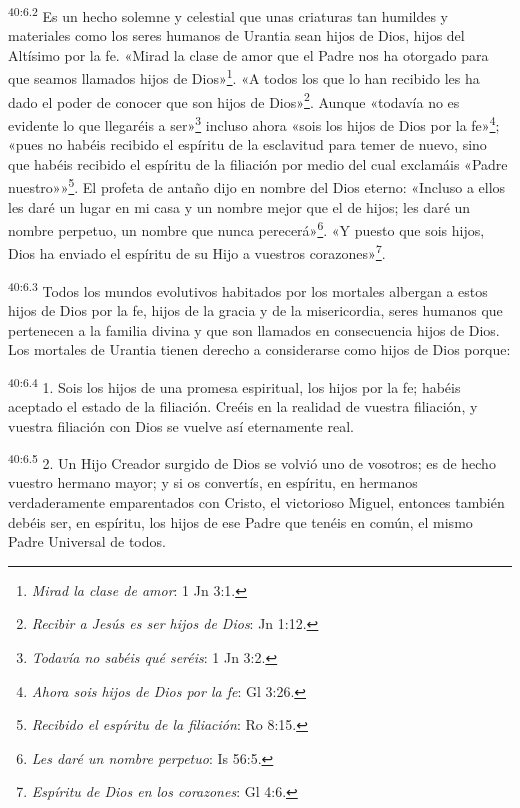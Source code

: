 \par
\textsuperscript{40:6.2} Es un hecho solemne y celestial que unas criaturas tan humildes y materiales como los seres humanos de Urantia sean hijos de Dios, hijos del Altísimo por la fe. «Mirad la clase de amor que el Padre nos ha otorgado para que seamos llamados hijos de Dios»\footnote{\textit{Mirad la clase de amor}: 1 Jn 3:1.}. «A todos los que lo han recibido les ha dado el poder de conocer que son hijos de Dios»\footnote{\textit{Recibir a Jesús es ser hijos de Dios}: Jn 1:12.}. Aunque «todavía no es evidente lo que llegaréis a ser»\footnote{\textit{Todavía no sabéis qué seréis}: 1 Jn 3:2.} incluso ahora «sois los hijos de Dios por la fe»\footnote{\textit{Ahora sois hijos de Dios por la fe}: Gl 3:26.}; «pues no habéis recibido el espíritu de la esclavitud para temer de nuevo, sino que habéis recibido el espíritu de la filiación por medio del cual exclamáis «Padre nuestro»»\footnote{\textit{Recibido el espíritu de la filiación}: Ro 8:15.}. El profeta de antaño dijo en nombre del Dios eterno: «Incluso a ellos les daré un lugar en mi casa y un nombre mejor que el de hijos; les daré un nombre perpetuo, un nombre que nunca perecerá»\footnote{\textit{Les daré un nombre perpetuo}: Is 56:5.}. «Y puesto que sois hijos, Dios ha enviado el espíritu de su Hijo a vuestros corazones»\footnote{\textit{Espíritu de Dios en los corazones}: Gl 4:6.}.

\par
\textsuperscript{40:6.3} Todos los mundos evolutivos habitados por los mortales albergan a estos hijos de Dios por la fe, hijos de la gracia y de la misericordia, seres humanos que pertenecen a la familia divina y que son llamados en consecuencia hijos de Dios. Los mortales de Urantia tienen derecho a considerarse como hijos de Dios porque:

\par
\textsuperscript{40:6.4} 1. Sois los hijos de una promesa espiritual, los hijos por la fe; habéis aceptado el estado de la filiación. Creéis en la realidad de vuestra filiación, y vuestra filiación con Dios se vuelve así eternamente real.

\par
\textsuperscript{40:6.5} 2. Un Hijo Creador surgido de Dios se volvió uno de vosotros; es de hecho vuestro hermano mayor; y si os convertís, en espíritu, en hermanos verdaderamente emparentados con Cristo, el victorioso Miguel, entonces también debéis ser, en espíritu, los hijos de ese Padre que tenéis en común, el mismo Padre Universal de todos.

